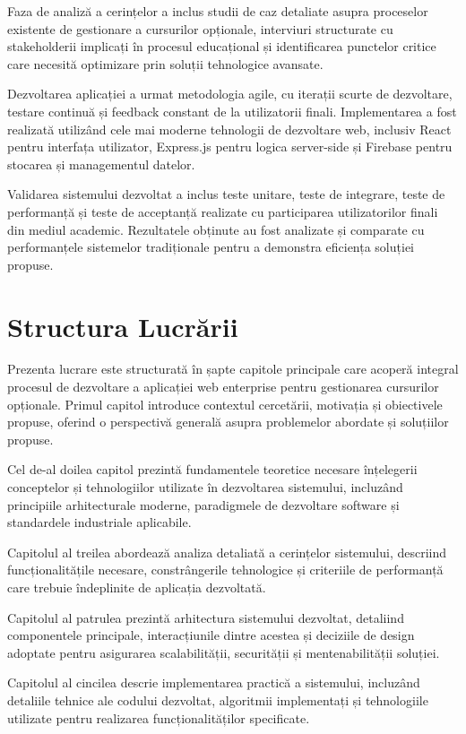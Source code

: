 \documentclass[12pt,a4paper]{report}
\begin{document}
Faza de analiză a cerințelor a inclus studii de caz detaliate asupra proceselor existente de gestionare a cursurilor opționale, interviuri structurate cu stakeholderii implicați în procesul educațional și identificarea punctelor critice care necesită optimizare prin soluții tehnologice avansate.

Dezvoltarea aplicației a urmat metodologia agile, cu iterații scurte de dezvoltare, testare continuă și feedback constant de la utilizatorii finali. Implementarea a fost realizată utilizând cele mai moderne tehnologii de dezvoltare web, inclusiv React pentru interfața utilizator, Express.js pentru logica server-side și Firebase pentru stocarea și managementul datelor.

Validarea sistemului dezvoltat a inclus teste unitare, teste de integrare, teste de performanță și teste de acceptanță realizate cu participarea utilizatorilor finali din mediul academic. Rezultatele obținute au fost analizate și comparate cu performanțele sistemelor tradiționale pentru a demonstra eficiența soluției propuse.

\section{Structura Lucrării}

Prezenta lucrare este structurată în șapte capitole principale care acoperă integral procesul de dezvoltare a aplicației web enterprise pentru gestionarea cursurilor opționale. Primul capitol introduce contextul cercetării, motivația și obiectivele propuse, oferind o perspectivă generală asupra problemelor abordate și soluțiilor propuse.

Cel de-al doilea capitol prezintă fundamentele teoretice necesare înțelegerii conceptelor și tehnologiilor utilizate în dezvoltarea sistemului, incluzând principiile arhitecturale moderne, paradigmele de dezvoltare software și standardele industriale aplicabile.

Capitolul al treilea abordează analiza detaliată a cerințelor sistemului, descriind funcționalitățile necesare, constrângerile tehnologice și criteriile de performanță care trebuie îndeplinite de aplicația dezvoltată.

Capitolul al patrulea prezintă arhitectura sistemului dezvoltat, detaliind componentele principale, interacțiunile dintre acestea și deciziile de design adoptate pentru asigurarea scalabilității, securității și mentenabilității soluției.

Capitolul al cincilea descrie implementarea practică a sistemului, incluzând detaliile tehnice ale codului dezvoltat, algoritmii implementați și tehnologiile utilizate pentru realizarea funcționalităților specificate.
\end{document}
